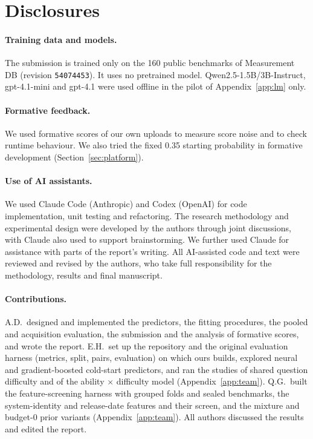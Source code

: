 \documentclass{article}
\newcommand{\code}[1]{\texttt{#1}}
\begin{document}
\section{Disclosures}
\label{app:disclosure}

\paragraph{Training data and models.} The submission is trained only on the 160 public benchmarks of Measurement DB (revision \code{54074453}). It uses no pretrained model. Qwen2.5-1.5B/3B-Instruct, gpt-4.1-mini and gpt-4.1 were used offline in the pilot of Appendix~\ref{app:lm} only.

\paragraph{Formative feedback.} We used formative scores of our own uploads to measure score noise and to check runtime behaviour. We also tried the fixed 0.35 starting probability in formative development (Section~\ref{sec:platform}).

\paragraph{Use of AI assistants.} We used Claude Code (Anthropic) and Codex (OpenAI) for code implementation, unit testing and refactoring. The research methodology and experimental design were developed by the authors through joint discussions, with Claude also used to support brainstorming. We further used Claude for assistance with parts of the report's writing. All AI-assisted code and text were reviewed and revised by the authors, who take full responsibility for the methodology, results and final manuscript.

\paragraph{Contributions.} A.D.\ designed and implemented the predictors, the fitting procedures, the pooled and acquisition evaluation, the submission and the analysis of formative scores, and wrote the report. E.H.\ set up the repository and the original evaluation harness (metrics, split, pairs, evaluation) on which ours builds, explored neural and gradient-boosted cold-start predictors, and ran the studies of shared question difficulty and of the ability $\times$ difficulty model (Appendix~\ref{app:team}). Q.G.\ built the feature-screening harness with grouped folds and sealed benchmarks, the system-identity and release-date features and their screen, and the mixture and budget-0 prior variants (Appendix~\ref{app:team}). All authors discussed the results and edited the report.
\end{document}
